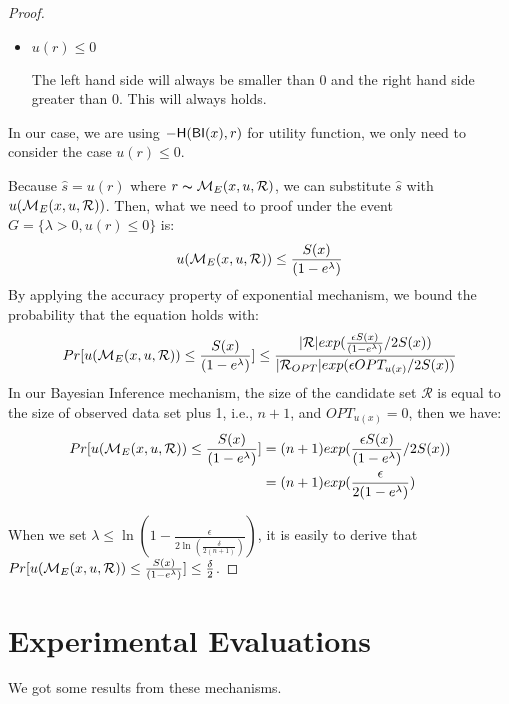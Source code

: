 \begin{proof}
\begin{itemize}
\begin{itemize}
		\item $u(r) \leq 0$

		The left hand side will always be smaller than 0 and the right hand side greater than 0. This will always holds.

	\end{itemize}
\end{itemize}


In our case, we are using $-\mathsf{H}(\mathsf{BI}(x),r)$ for utility function, we only need to consider the case $u(r) \leq 0$.

Because $\hat{s} = u(r)$ where $r \thicksim \mathcal{M}_E(x, u, \mathcal{R})$, we can substitute $\hat{s}$ with $u(\mathcal{M}_E(x, u, \mathcal{R}))$. Then, what we need to proof under the event $G = \{\lambda > 0, u(r) \leq 0\}$ is:
\begin{equation*}
u(\mathcal{M}_E(x, u, \mathcal{R})) \leq \frac{S(x)}{(1 - e ^ {\lambda})}
\end{equation*}
By applying the accuracy property of exponential mechanism, we bound the probability that the equation holds with:
\begin{equation*}
\begin{split}
Pr[u(\mathcal{M}_E(x, u, \mathcal{R})) \leq \frac{S(x)}{(1 - e ^ {\lambda})}] 
& \leq \frac{|\mathcal{R}|exp(\frac{\epsilon S(x)}{(1 - e ^ {\lambda})}/2 S(x))}{|\mathcal{R}_{OPT}| exp(\epsilon OPT_{u(x)}/2 S(x))}\\
\end{split}
\end{equation*}
In our Bayesian Inference mechanism, the size of the candidate set $\mathcal{R}$ is equal to the size of observed data set plus 1, i.e., $n + 1$, and $OPT_{u(x)} = 0$, then we have:
\begin{equation*}
\begin{split}
Pr[u(\mathcal{M}_E(x, u, \mathcal{R})) \leq \frac{S(x)}{(1 - e ^ {\lambda})}] 
& = (n + 1)exp(\frac{\epsilon S(x)}{(1 - e ^ {\lambda})}/2 S(x))\\
& = (n + 1)exp(\frac{\epsilon}{2 (1 - e ^ {\lambda})})\\
\end{split}
\end{equation*}

When we set $\lambda \leq \ln(1 - \frac{\epsilon}{2 \ln (\frac{\delta}{2 (n + 1)})})$, it is easily to derive that $Pr[u(\mathcal{M}_E(x, u, \mathcal{R})) \leq \frac{S(x)}{(1 - e ^ {\lambda})}] \leq \frac{\delta}{2}$.





\end{proof}

\section{Experimental Evaluations}
We got some results from these mechanisms.






